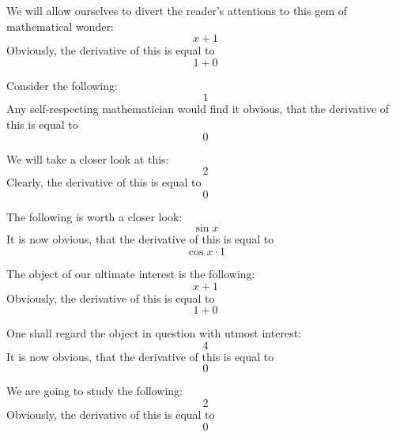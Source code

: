 \documentclass{article}
\begin{document}
We will allow ourselves to divert the reader's attentions to this gem of mathematical wonder:
\begin{equation}
x + 1 
\end{equation}
Obviously, the derivative of this is equal to
\begin{equation}
1 + 0 
\end{equation}

Consider the following:
\begin{equation}
1 
\end{equation}
Any self-respecting mathematician would find it obvious, that the derivative of this is equal to
\begin{equation}
0 
\end{equation}

We will take a closer look at this:
\begin{equation}
2 
\end{equation}
Clearly, the derivative of this is equal to
\begin{equation}
0 
\end{equation}

The following is worth a closer look:
\begin{equation}
\sin x 
\end{equation}
It is now obvious, that the derivative of this is equal to
\begin{equation}
\cos x \cdot 1 
\end{equation}

The object of our ultimate interest is the following:
\begin{equation}
x + 1 
\end{equation}
Obviously, the derivative of this is equal to
\begin{equation}
1 + 0 
\end{equation}

One shall regard the object in question with utmost interest:
\begin{equation}
4 
\end{equation}
It is now obvious, that the derivative of this is equal to
\begin{equation}
0 
\end{equation}

We are going to study the following:
\begin{equation}
2 
\end{equation}
Obviously, the derivative of this is equal to
\begin{equation}
0 
\end{equation}
\end{document}
